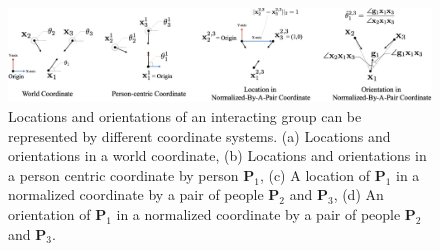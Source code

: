 
%

\begin{figure}
	\centering
	\includegraphics[width=\textwidth]{figures/ssp_notation3}
	\caption{Locations and orientations of an interacting group can be represented by different coordinate systems. (a) Locations and orientations in a world coordinate, (b) Locations and orientations in a person centric coordinate by person $\mathbf{P}_1$, (c) A location of $\mathbf{P}_1$  in a normalized coordinate by a pair of people $\mathbf{P}_2$ and $\mathbf{P}_3$, (d) An orientation of $\mathbf{P}_1$ in a normalized coordinate by a pair of people  $\mathbf{P}_2$ and $\mathbf{P}_3$. } 
	\label{fig:ssp_notation1}
\end{figure}


